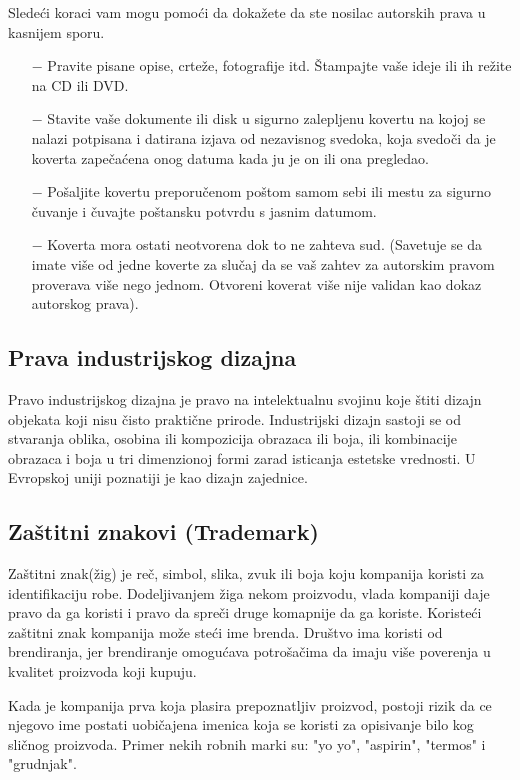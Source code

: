 \documentclass[a4paper]{article}
\begin{document}
Sledeći koraci vam mogu pomoći da dokažete da ste nosilac autorskih prava u kasnijem sporu.

\begin{itemize}
\item[$-$] Pravite pisane opise, crteže, fotografije itd. Štampajte vaše ideje ili ih režite na CD ili DVD.
\item[$-$] Stavite vaše dokumente ili disk u sigurno zalepljenu kovertu na kojoj se nalazi potpisana i datirana izjava od nezavisnog svedoka, koja svedoči da je koverta zapečaćena onog datuma kada ju je on ili ona pregledao.
\item[$-$] Pošaljite kovertu preporučenom poštom samom sebi ili mestu za sigurno čuvanje i čuvajte poštansku potvrdu s jasnim datumom.
\item[$-$] Koverta mora ostati neotvorena dok to ne zahteva sud. (Savetuje se da imate više od jedne koverte za slučaj da se vaš zahtev za autorskim pravom proverava više nego jednom. Otvoreni koverat više nije validan kao dokaz autorskog prava).
\end{itemize}

\subsection{Prava industrijskog dizajna}
\label{subsec:dizajn}

Pravo industrijskog dizajna je pravo na intelektualnu svojinu koje štiti dizajn objekata koji nisu čisto praktične prirode. Industrijski dizajn sastoji se od stvaranja oblika, osobina ili kompozicija obrazaca ili boja, ili kombinacije obrazaca i boja u tri dimenzionoj formi zarad isticanja estetske vrednosti. U Evropskoj uniji poznatiji je kao dizajn zajednice.

\subsection{Zaštitni znakovi (Trademark)}
\label{subsec:trademark}

Zaštitni znak(žig) je reč, simbol, slika, zvuk ili boja koju kompanija koristi za identifikaciju robe. Dodeljivanjem žiga nekom proizvodu, vlada kompaniji daje pravo da ga koristi i pravo da spreči druge komapnije da ga koriste. Koristeći zaštitni znak kompanija može steći ime brenda. Društvo ima koristi od brendiranja, jer brendiranje omogućava potrošačima da imaju više poverenja u kvalitet proizvoda koji kupuju. 

Kada je kompanija prva koja plasira prepoznatljiv proizvod, postoji rizik da ce njegovo ime postati uobičajena imenica koja se koristi za opisivanje bilo kog sličnog proizvoda. Primer nekih robnih marki su: "yo yo", "aspirin", "termos" i "grudnjak".
\end{document}
